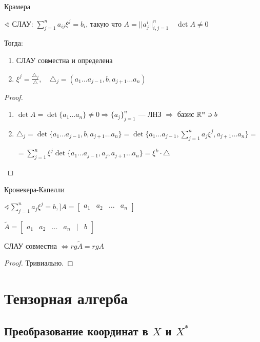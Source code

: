 \begin{theorem}
    Крамера

    $\sphericalangle$ СЛАУ: $\sum\limits_{j=1}^n a_{ij} \xi^j = b_i$, такую что $A=||a_j^i||_{i,j=1}^n \quad \det A\not=0$

    Тогда:
    \begin{enumerate}
        \item СЛАУ совместна и определена
        \item $\xi^j=\frac{\triangle_j}{\triangle},\quad \triangle_j=(a_1\ldots a_{j-1}, b, a_{j+1}\ldots a_n)$
    \end{enumerate}
\end{theorem}
\begin{proof}
    \begin{enumerate}
        \item $\det A = \det \{a_1\ldots a_n\} \not= 0 \Rightarrow \{a_j\}_{j=1}^n$ --- ЛНЗ $\Rightarrow$ базис $\mathbb{R}^n\ni b$
        \item $\triangle_j=\det\{a_1\ldots a_{j-1}, b, a_{j+1}\ldots a_n\}=\det\{a_1\ldots a_{j-1}, \sum\limits_{j=1}^n a_{j} \xi^j, a_{j+1}\ldots a_n\}=$
        
        $=\sum\limits_{j=1}^n \xi^j\det\{a_1\ldots a_{j-1},  a_{j} , a_{j+1}\ldots a_n\}=\xi^k\cdot\triangle$
    \end{enumerate}
\end{proof}

\begin{theorem}
    Кронекера-Капелли

    $\sphericalangle \sum\limits_{j=1}^n a_j\xi^j=b, ] A = \begin{bmatrix}
        a_1 & a_2 & \ldots & a_n
    \end{bmatrix}$

    $\tilde A = \begin{bmatrix}
        a_1 & a_2 & \ldots & a_n & | & b
    \end{bmatrix}$

    СЛАУ совместна $\Leftrightarrow rg \tilde A = rg A$
\end{theorem}
\begin{proof}
    Тривиально.
\end{proof}

\section{Тензорная алгерба}

\subsection{Преобразование координат в $X$ и $X^*$}

